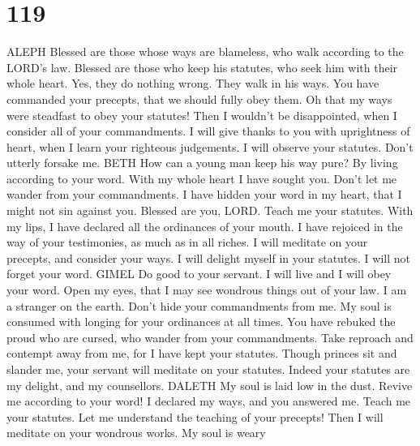 \hypertarget{section-111}{%
\section{119}\label{section-111}}

ALEPH  Blessed are those whose ways are blameless, who
walk according to the LORD's law.  Blessed are those who
keep his statutes, who seek him with their whole heart. 
Yes, they do nothing wrong. They walk in his ways.  You
have commanded your precepts, that we should fully obey them.
 Oh that my ways were steadfast to obey your statutes!
 Then I wouldn't be disappointed, when I consider all of
your commandments.  I will give thanks to you with
uprightness of heart, when I learn your righteous judgements.
 I will observe your statutes. Don't utterly forsake me.
BETH  How can a young man keep his way pure? By living
according to your word.  With my whole heart I have
sought you. Don't let me wander from your commandments. 
I have hidden your word in my heart, that I might not sin against you.
 Blessed are you, LORD. Teach me your statutes.
 With my lips, I have declared all the ordinances of your
mouth.  I have rejoiced in the way of your testimonies,
as much as in all riches.  I will meditate on your
precepts, and consider your ways.  I will delight myself
in your statutes. I will not forget your word. GIMEL  Do
good to your servant. I will live and I will obey your word.
 Open my eyes, that I may see wondrous things out of your
law.  I am a stranger on the earth. Don't hide your
commandments from me.  My soul is consumed with longing
for your ordinances at all times.  You have rebuked the
proud who are cursed, who wander from your commandments. 
Take reproach and contempt away from me, for I have kept your statutes.
 Though princes sit and slander me, your servant will
meditate on your statutes.  Indeed your statutes are my
delight, and my counsellors. DALETH  My soul is laid low
in the dust. Revive me according to your word!  I
declared my ways, and you answered me. Teach me your statutes.
 Let me understand the teaching of your precepts! Then I
will meditate on your wondrous works.  My soul is weary
